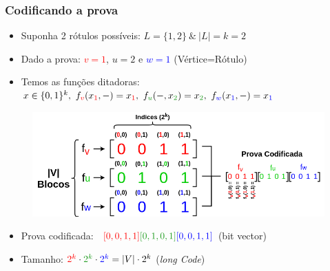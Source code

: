 \documentclass[11pt, handout]{beamer}
\newcommand{\red}[1]{\textcolor{red}{#1}}
\newcommand{\blue}[1]{\textcolor{blue}{#1}}
\newcommand{\green}[1]{\textcolor{pine}{#1}}
\begin{document}
\begin{frame}[<+->]
\frametitle{Codificando a prova}
    \begin{itemize}
        \item Suponha 2 rótulos possíveis: $L=\{1,2\}\ \& \ |L|=k=2$
        \item Dado a prova:  \textcolor{red}{$v=1$}, \textcolor{pine}{$u=2$} e \textcolor{blue}{$w=1$} (Vértice=Rótulo)
        \item Temos as funções ditadoras: $x\in \{0,1\}^k, \ f_{\red{v}}(x_{\red{1}},-)=x_{\red{1}}, \ f_{\green{u}}(-,x_{\green{2}})=x_{\green{2}}, \ f_{\textcolor{blue}{w}}(x_{\textcolor{blue}{1}},-)=x_{\textcolor{blue}{1}}$
        \end{itemize}
        \begin{figure}
                \includegraphics[width=1\textwidth]{images/encoding.png}
        \end{figure}
        \begin{itemize}
        \item Prova codificada: \ $\red{[0,0,1,1]} \green{[0,1,0,1]} \blue{[0,0,1,1]} $ (bit vector)
        \item Tamanho: $\red{2^k}\cdot \green{2^k}\cdot \blue{2^k} = |V|\cdot 2^k$ (\textit{long Code})
    \end{itemize}
\end{frame}{}
\end{document}
